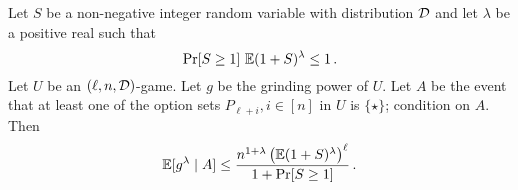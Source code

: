     \begin{lemma}
        \label{lemma:adaptive-moment}
        Let $S$ be a non-negative integer random variable with distribution $\mathcal{D}$ 
        and let $\lambda$ be a positive real such that 
        \begin{equation}\label{eq:lambda-S-requirement}
            \Pr[S \geq 1]\,\operatorname{\mathbb{E}} (1 + S)^\lambda \leq 1  
            \,.
        \end{equation}
        Let $U$ be an $(\ell, n, \mathcal{D})$-game.
        Let $g$ be the grinding power of $U$. 
        Let $A$ be the event that 
        at least one of the option sets $P_{\ell + i}, i \in [n]$ in $U$ is $\{\star\}$; 
        condition on $A$.
        Then 
        $$
            \operatorname{\mathbb{E}}[g^\lambda \mid A] \leq 
                \frac{n^{1 + \lambda} \left(\operatorname{\mathbb{E}} (1 + S)^\lambda\right)^{\ell}}{1 + \Pr[S \geq 1]}            
                \,.
        $$
    \end{lemma}

